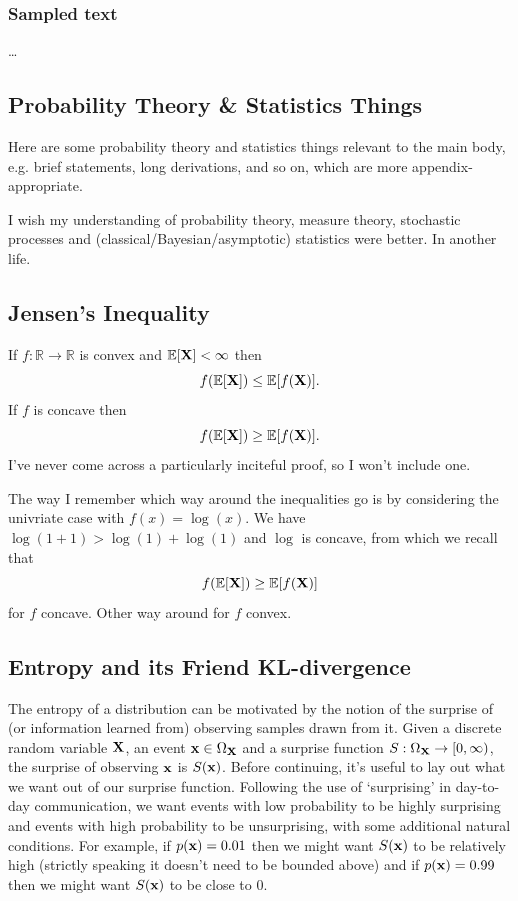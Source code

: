\documentclass[11pt]{article}
\begin{document}
\subsubsection{Sampled text}
\dots

\newpage
\begin{appendices}

\section{Probability Theory \& Statistics Things}
Here are some probability theory and statistics things relevant to the main body, e.g. brief statements, long derivations, and so on, which are more appendix-appropriate.

I wish my understanding of probability theory, measure theory, stochastic processes and (classical/Bayesian/asymptotic) statistics were better. In another life.

\subsection{Jensen's Inequality}
If $f:\mathbb{R}\to\mathbb{R}$ is convex and $\mathbb{E}[\mathbf{X}]<\infty$ then
$$
f(\mathbb{E}[\mathbf{X}])\leq\mathbb{E}[f(\mathbf{X})].
$$
If $f$ is concave then
$$
f(\mathbb{E}[\mathbf{X}])\geq\mathbb{E}[f(\mathbf{X})].
$$
I've never come across a particularly inciteful proof, so I won't include one.

The way I remember which way around the inequalities go is by considering the univriate case with $f(x)=\log(x)$. We have $\log(1+1)>\log(1)+\log(1)$ and $\log$ is concave, from which we recall that
$$
f(\mathbb{E}[\mathbf{X}])
\geq
\mathbb{E}[f(\mathbf{X})]
$$
for $f$ concave. Other way around for $f$ convex.

\subsection{Entropy and its Friend KL-divergence}
\label{app:entropy}

The entropy of a distribution can be motivated by the notion of the surprise of (or information learned from) observing samples drawn from it. Given a discrete random variable $\mathbf{X}$, an event $\mathbf{x}\in\Omega_{\mathbf{X}}$ and a surprise function $S:\Omega_{\mathbf{X}}\rightarrow[0,\infty)$, the surprise of observing $\mathbf{x}$ is $S(\mathbf{x})$. Before continuing, it's useful to lay out what we want out of our surprise function. Following the use of `surprising' in day-to-day communication, we want events with low probability to be highly surprising and events with high probability to be unsurprising, with some additional natural conditions. For example, if $p(\mathbf{x})=0.01$ then we might want $S(\mathbf{x})$ to be relatively high (strictly speaking it doesn't need to be bounded above) and if $p(\mathbf{x})=0.99$ then we might want $S(\mathbf{x})$ to be close to $0$.


\end{appendices}
\end{document}
